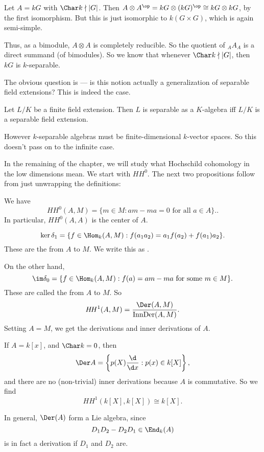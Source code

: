 \documentclass[a4paper]{article}
\newcommand\HH{H\!H}
\begin{document}
\begin{eg}
  Let $A = kG$ with $\Char k \nmid |G|$. Then $A \otimes A^\op = kG \otimes (kG)^\op \cong kG \otimes kG$, by the first isomorphism. But this is just isomorphic to $k(G \times G)$, which is again semi-simple.

  Thus, as a bimodule, $A \otimes A$ is completely reducible. So the quotient of $_AA_A$ is a direct summand (of bimodules). So we know that whenever $\Char k \nmid |G|$, then $kG$ is $k$-separable.
\end{eg}

The obvious question is --- is this notion actually a generalization of separable field extensions? This is indeed the case.
\begin{fact} %
  Let $L/K$ be a finite field extension. Then $L$ is separable as a $K$-algebra iff $L/K$ is a separable field extension.
\end{fact}
However $k$-separable algebras must be finite-dimensional $k$-vector spaces. So this doesn't pass on to the infinite case.

In the remaining of the chapter, we will study what Hochschild cohomology in the low dimensions mean. We start with $\HH^0$. The next two propositions follow from just unwrapping the definitions:
\begin{prop}
  We have
  \[
    \HH^0(A, M) = \{m \in M : am - ma = 0\text{ for all }a \in A\}..
  \]
  In particular, $\HH^0(A, A)$ is the center of $A$.
\end{prop}

\begin{prop}
  \[
    \ker \delta_1 = \{f \in \Hom_k(A, M): f(a_1 a_2) = a_1 f(a_2) + f(a_1) a_2\}.
  \]
  These are the  from $A$ to $M$. We write this as .

  On the other hand,
  \[
    \im \delta_0 = \{f \in \Hom_k(A, M): f(a) = am - ma \text{ for some }m \in M\}.
  \]
  These are called the  from $A$ to $M$. So
  \[
    \HH^1(A, M) = \frac{\Der(A, M)}{\mathrm{InnDer}(A, M)}.
  \]
  Setting $A = M$, we get the derivations and inner derivations of $A$.
\end{prop}

\begin{eg}
  If $A = k[x]$, and $\Char k = 0$, then
  \[
    \Der A = \left\{p(X) \frac{\d}{\d x} : p(x) \in k[X]\right\},
  \]
  and there are no (non-trivial) inner derivations because $A$ is commutative. So we find
  \[
    \HH^1(k[X], k[X]) \cong k[X].
  \]
\end{eg}
In general, $\Der(A)$ form a Lie algebra, since
\[
  D_1 D_2 - D_2 D_1 \in \End_k(A)
\]
is in fact a derivation if $D_1$ and $D_2$ are.
\end{document}
